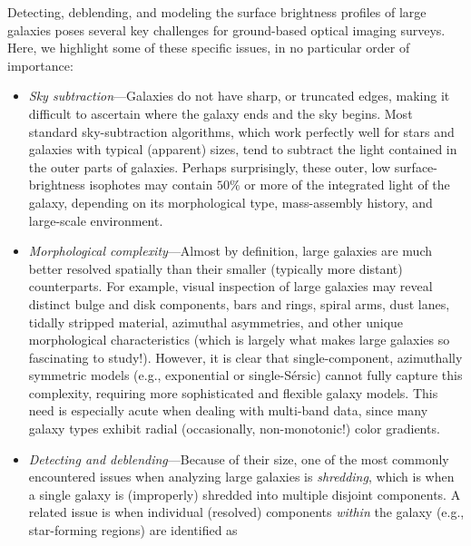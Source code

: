 Detecting, deblending, and modeling the surface brightness profiles of large
galaxies poses several key challenges for ground-based optical imaging surveys.
Here, we highlight some of these specific issues, in no particular order of
importance:
\begin{itemize}
\item{{\em Sky subtraction}---Galaxies do not have sharp, or truncated edges,
  making it difficult to ascertain where the galaxy ends and the sky begins.
  Most standard sky-subtraction algorithms, which work perfectly well for stars
  and galaxies with typical (apparent) sizes, tend to subtract the light
  contained in the outer parts of galaxies.  Perhaps surprisingly, these outer,
  low surface-brightness isophotes may contain $50\%$ or more of the integrated
  light of the galaxy, depending on its morphological type, mass-assembly
  history, and large-scale environment.}
\item{{\em Morphological complexity}---Almost by definition, large galaxies are
  much better resolved spatially than their smaller (typically more distant)
  counterparts.  For example, visual inspection of large galaxies may reveal
  distinct bulge and disk components, bars and rings, spiral arms, dust lanes,
  tidally stripped material, azimuthal asymmetries, and other unique
  morphological characteristics (which is largely what makes large galaxies so
  fascinating to study!).  However, it is clear that single-component,
  azimuthally symmetric models (e.g., exponential or single-S\'{e}rsic) cannot
  fully capture this complexity, requiring more sophisticated and flexible
  galaxy models.  This need is especially acute when dealing with multi-band
  data, since many galaxy types exhibit radial (occasionally, non-monotonic!)
  color gradients.}
\item{{\em Detecting and deblending}---Because of their size, one of the most
  commonly encountered issues when analyzing large galaxies is \emph{shredding},
  which is when a single galaxy is (improperly) shredded into multiple disjoint
  components.  A related issue is when individual (resolved) components
  \emph{within} the galaxy (e.g., star-forming regions) are identified as
}
\end{itemize}
